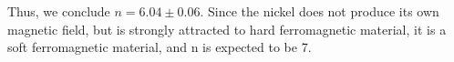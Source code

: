 \documentclass[letterpaper]{article}
\begin{document}
Thus, we conclude $n=6.04\pm0.06$. Since the nickel does not produce its own magnetic field, but is strongly attracted to hard ferromagnetic material, it is a soft ferromagnetic material, and n is expected to be 7.
%
%
%
%
\end{document}
